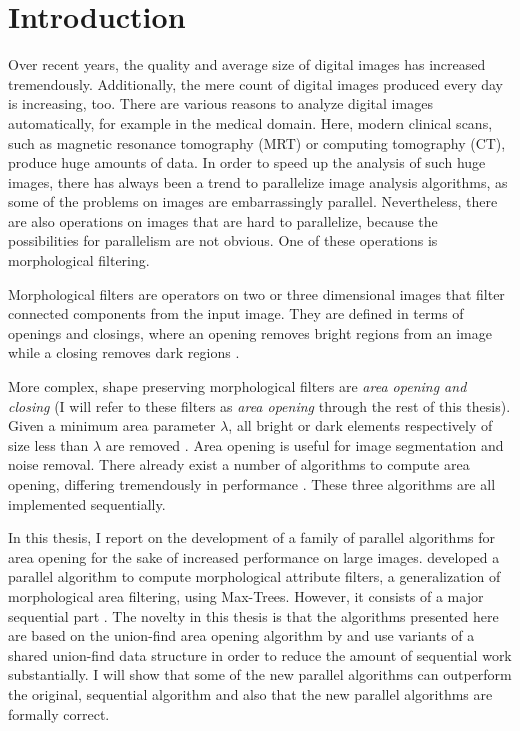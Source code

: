 \chapter{Introduction}
\label{chpt:introduction}

Over recent years, the quality and average size of digital images has increased
tremendously. Additionally, the mere count of digital images produced every day
is increasing, too. There are various reasons to analyze digital images
automatically, for example in the medical domain. Here, modern clinical scans,
such as magnetic resonance tomography (MRT) or computing tomography (CT),
produce huge amounts of data. In order to speed up the analysis of such huge
images, there has always been a trend to parallelize image analysis algorithms,
as some of the problems on images are embarrassingly parallel. Nevertheless,
there are also operations on images that are hard to parallelize, because the
possibilities for parallelism are not obvious. One of these operations is
morphological filtering.

Morphological filters are operators on two or three dimensional
images that filter connected components from the input image. They are defined
in terms of openings and closings, where an opening removes bright regions from
an image while a closing removes dark regions \cite{Serra1992Overview}.

More complex, shape preserving morphological filters are \emph{area opening and
  closing} (I will refer to these filters as \emph{area opening} through the
rest of this thesis). Given a minimum area parameter $\lambda$, all bright or
dark elements respectively of size less than $\lambda$ are removed
\cite{Vincent1994Morphological}. Area opening is useful for image segmentation
and noise removal. There already exist a number of algorithms to compute area
opening, differing tremendously in performance \cite{Vincent1994Morphological,
  Wilkinson2000Fast, Meijster2002Comparison}. These three algorithms are all
implemented sequentially.

In this thesis, I report on the development of a family of parallel algorithms
for area opening for the sake of increased performance on large
images. \citet{Wilkinson2008Concurrent} developed a parallel algorithm to
compute morphological attribute filters, a generalization of morphological area
filtering, using Max-Trees. However, it consists of a major sequential part
\cite{Wilkinson2008Concurrent}. The novelty in this thesis is that the
algorithms presented here are based on the union-find area opening algorithm by
\citet{Meijster2002Comparison} and use variants of a shared union-find data
structure \cite{Tarjan1983Data} in order to reduce the amount of sequential work
substantially. I will show that some of the new parallel algorithms can
outperform the original, sequential algorithm and also that the new parallel
algorithms are formally correct.


